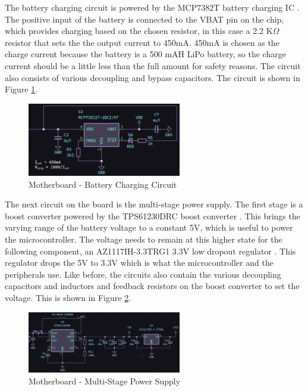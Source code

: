 \documentclass[12pt]{article}
\begin{document}
    The battery charging circuit is powered by the MCP7382T battery charging IC \cite{mcp73832}. The positive input of the battery is connected to the VBAT pin on the chip, which provides charging based on the chosen resistor, in this case a 2.2 K$\Omega$ resistor that sets the the output current to 450mA. 450mA is chosen as the charge current because the battery is a 500 mAH LiPo battery, so the charge current should be a little less than the full amount for safety reasons. The circuit also consists of various decoupling and bypass capacitors. The circuit is shown in Figure \ref{pcb_battery}.

    \begin{figure}[ht]
        \centering
        \includegraphics[width=0.6\textwidth]{images/pcb_battery.png}
        \caption{Motherboard - Battery Charging Circuit}
        \label{pcb_battery}
    \end{figure}

    The next circuit on the board is the multi-stage power supply. The first stage is a boost converter powered by the TPS61230DRC boost converter \cite{boost}. This brings the varying range of the battery voltage to a constant 5V, which is useful to power the microcontroller. The voltage needs to remain at this higher state for the following component, an AZ1117IH-3.3TRG1 3.3V low dropout regulator \cite{3v3}. This regulator drops the 5V to 3.3V which is what the microcontroller and the peripherals use. Like before, the circuits also contain the various decoupling capacitors and inductors and feedback resistors on the boost converter to set the voltage. This is shown in Figure \ref{pcb_power}.

    \begin{figure}[ht]
        \centering
        \includegraphics[width=0.6\textwidth]{images/pcb_power.png}
        \caption{Motherboard - Multi-Stage Power Supply}
        \label{pcb_power}
    \end{figure}
\end{document}
